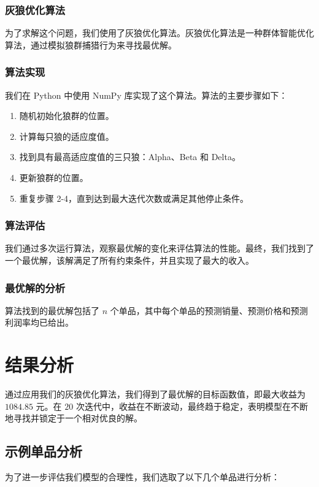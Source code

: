 \documentclass[withoutpreface,bwprint]{cumcmthesis} %
\begin{document}
\subsubsection{灰狼优化算法}
为了求解这个问题，我们使用了灰狼优化算法。灰狼优化算法是一种群体智能优化算法，通过模拟狼群捕猎行为来寻找最优解。

\subsubsection{算法实现}
我们在 Python 中使用 NumPy 库实现了这个算法。算法的主要步骤如下：

\begin{enumerate}
    \item 随机初始化狼群的位置。
    \item 计算每只狼的适应度值。
    \item 找到具有最高适应度值的三只狼：Alpha、Beta 和 Delta。
    \item 更新狼群的位置。
    \item 重复步骤 2-4，直到达到最大迭代次数或满足其他停止条件。
\end{enumerate}


\subsubsection{算法评估}
我们通过多次运行算法，观察最优解的变化来评估算法的性能。最终，我们找到了一个最优解，该解满足了所有约束条件，并且实现了最大的收入。


\subsubsection{最优解的分析}
算法找到的最优解包括了 \(n\) 个单品，其中每个单品的预测销量、预测价格和预测利润率均已给出。

\section{结果分析}

通过应用我们的灰狼优化算法，我们得到了最优解的目标函数值，即最大收益为 \(1084.85\) 元。在 \(20\) 次迭代中，收益在不断波动，最终趋于稳定，表明模型在不断地寻找并锁定于一个相对优良的解。

\subsection{示例单品分析}

为了进一步评估我们模型的合理性，我们选取了以下几个单品进行分析：
\end{document}
